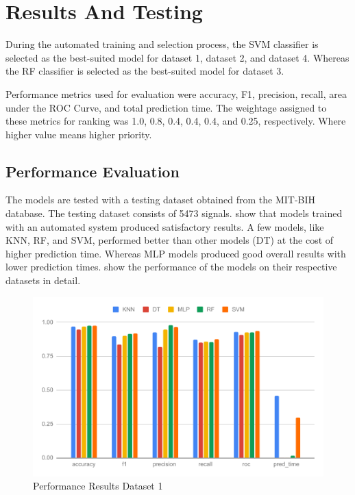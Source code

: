 \section{Results And Testing} \label{sec:results_and_testing}
During the automated training and selection process, the SVM classifier is selected as the best-suited model for dataset 1, dataset 2, and dataset 4. Whereas the RF classifier is selected as the best-suited model for dataset 3.

Performance metrics used for evaluation were accuracy, F1, precision, recall, area under the ROC Curve, and total prediction time. The weightage assigned to these metrics for ranking was 1.0, 0.8, 0.4, 0.4, 0.4, and 0.25, respectively. Where higher value means higher priority.

\subsection{Performance Evaluation} \label{subsec:performance_evaluation}
The models are tested with a testing dataset obtained from the MIT-BIH database. The testing dataset consists of 5473 signals.  show that models trained with an automated system produced satisfactory results. A few models, like KNN, RF, and SVM, performed better than other models (DT) at the cost of higher prediction time. Whereas MLP models produced good overall results with lower prediction times.
 show the performance of the models on their respective datasets in detail.

\begin{figure}[ht]
    \centering
    \includegraphics[width=1.9\columnwidth]{media/ch_result_and_testing/perf_ds_1.pdf}
    \caption{Performance Results Dataset 1} \label{fig:perfromance_results_dataset_1}
\end{figure}

